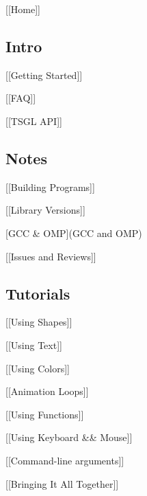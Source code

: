 \mbox{[}\mbox{[}Home\mbox{]}\mbox{]}

\subsection*{Intro}


\begin{DoxyItemize}
\item \mbox{[}\mbox{[}Getting Started\mbox{]}\mbox{]}
\item \mbox{[}\mbox{[}F\+A\+Q\mbox{]}\mbox{]}
\item \mbox{[}\mbox{[}T\+S\+G\+L A\+P\+I\mbox{]}\mbox{]}
\end{DoxyItemize}

\subsection*{Notes}


\begin{DoxyItemize}
\item \mbox{[}\mbox{[}Building Programs\mbox{]}\mbox{]}
\item \mbox{[}\mbox{[}Library Versions\mbox{]}\mbox{]}
\item \mbox{[}G\+C\+C \& O\+M\+P\mbox{]}(G\+C\+C and O\+M\+P)
\item \mbox{[}\mbox{[}Issues and Reviews\mbox{]}\mbox{]}
\end{DoxyItemize}

\subsection*{Tutorials}


\begin{DoxyItemize}
\item \mbox{[}\mbox{[}Using Shapes\mbox{]}\mbox{]}
\item \mbox{[}\mbox{[}Using Text\mbox{]}\mbox{]}
\item \mbox{[}\mbox{[}Using Colors\mbox{]}\mbox{]}
\item \mbox{[}\mbox{[}Animation Loops\mbox{]}\mbox{]}
\item \mbox{[}\mbox{[}Using Functions\mbox{]}\mbox{]}
\item \mbox{[}\mbox{[}Using Keyboard \&\& Mouse\mbox{]}\mbox{]}
\item \mbox{[}\mbox{[}Command-\/line arguments\mbox{]}\mbox{]}
\item \mbox{[}\mbox{[}Bringing It All Together\mbox{]}\mbox{]} 
\end{DoxyItemize}
